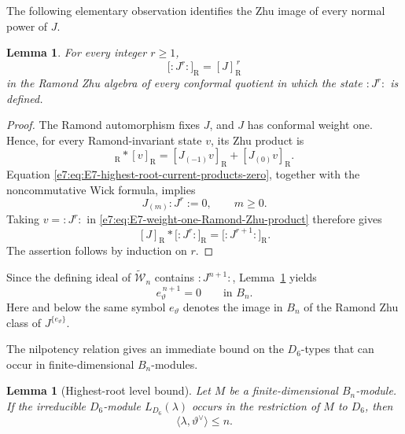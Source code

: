 \documentclass[11pt,reqno]{amsart}
\newtheorem{lemma}[theorem]{Lemma}
\theoremstyle{definition}
\theoremstyle{remark}
\begin{document}
The following elementary observation identifies the Zhu image of every
normal power of $J$.

\begin{lemma}
\label{e7:lem:E7-Zhu-image-normal-power}
For every integer $r\ge1$,
\begin{equation*}
  \bigl[:J^r:\bigr]_{\mathrm R}
  =[J]_{\mathrm R}^{\,r}
\end{equation*}
in the Ramond Zhu algebra of every conformal quotient in which the state
$:J^r:$ is defined.
\end{lemma}

\begin{proof}
The Ramond automorphism fixes $J$, and $J$ has conformal weight one.  Hence,
for every Ramond-invariant state $v$, its Zhu product is
\begin{equation}
  [J]_{\mathrm R}*[v]_{\mathrm R}
  =[J_{(-1)}v]_{\mathrm R}+[J_{(0)}v]_{\mathrm R}.
  \label{e7:eq:E7-weight-one-Ramond-Zhu-product}
\end{equation}
Equation \eqref{e7:eq:E7-highest-root-current-products-zero}, together with the
noncommutative Wick formula, implies
\begin{equation*}
  J_{(m)}:J^r:=0,
  \qquad m\ge0.
\end{equation*}
Taking $v=:J^r:$ in
\eqref{e7:eq:E7-weight-one-Ramond-Zhu-product} therefore gives
\[
  [J]_{\mathrm R}*\bigl[:J^r:\bigr]_{\mathrm R}
  =\bigl[:J^{r+1}:\bigr]_{\mathrm R}.
\]
The assertion follows by induction on $r$.
\end{proof}

Since the defining ideal of $\widetilde{\mathcal W}_n$ contains
$:J^{n+1}:$, Lemma~\ref{e7:lem:E7-Zhu-image-normal-power} yields
\begin{equation}
  e_\vartheta^{\,n+1}=0
  \qquad\text{in }B_n.
  \label{e7:eq:E7-highest-root-nilpotency-Bn}
\end{equation}
Here and below the same symbol $e_\vartheta$ denotes the image in $B_n$ of
the Ramond Zhu class of $J^{\{e_\vartheta\}}$.

The nilpotency relation gives an immediate bound on the $D_6$-types that can
occur in finite-dimensional $B_n$-modules.

\begin{lemma}[Highest-root level bound]
\label{e7:lem:E7-Bn-constituent-level-bound}
Let $M$ be a finite-dimensional $B_n$-module.  If the irreducible
$D_6$-module $L_{D_6}(\lambda)$ occurs in the restriction of $M$ to $D_6$,
then
\begin{equation}
  \langle\lambda,\vartheta^\vee\rangle\le n.
  \label{e7:eq:E7-Bn-constituent-level-bound}
\end{equation}
\end{lemma}
\end{document}
